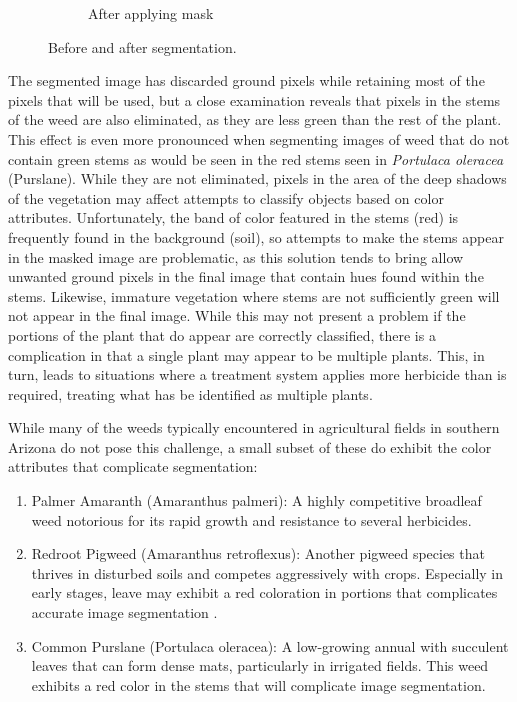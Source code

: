 \documentclass[letterpaper, notitlepage]{report}
\begin{document}
{\begin{figure}[H]
\begin{subfigure}[h]{.30\textwidth}
	  \caption{After applying mask}
	  \label{fig:original-masked}
	\end{subfigure}
	\caption[Before and after segmentation]{Before and after segmentation.}
	\label{fig:segmentation}
\end{figure}
The segmented image has discarded ground pixels while retaining most of the pixels that will be used, but a close examination reveals that pixels in the stems of the weed are also eliminated, as they are less green than the rest of the plant. This effect is even more pronounced when segmenting images of weed that do not contain green stems as would be seen in the red stems seen in \textit{Portulaca oleracea} (Purslane). While they are not eliminated, pixels in the area of the deep shadows of the vegetation may affect attempts to classify objects based on color attributes. Unfortunately, the band of color featured in the stems (red) is frequently found in the background (soil), so attempts to make the stems appear in the masked image are problematic, as this solution tends to bring allow unwanted ground pixels in the final image that contain hues found within the stems. Likewise, immature vegetation where stems are not sufficiently green will not appear in the final image.  While this may not present a problem if the portions of the plant that do appear are correctly classified, there is a complication in that a single plant may appear to be multiple plants. This, in turn, leads to situations where a treatment system applies more herbicide than is required, treating what has be identified as multiple plants.

While many of the weeds typically encountered in agricultural fields in southern Arizona do not pose this challenge,  a small subset of these do exhibit the color attributes that complicate segmentation:
\begin{enumerate}
	\item{Palmer Amaranth (Amaranthus palmeri): A highly competitive broadleaf weed notorious for its rapid growth and resistance to several herbicides.}

	\item{Redroot Pigweed (Amaranthus retroflexus): Another pigweed species that thrives in disturbed soils and competes aggressively with crops. Especially in early stages, leave may exhibit a red coloration in portions that complicates accurate image segmentation \parencite{Sosnoskie2018-ye}.}

	\item{Common Purslane (Portulaca oleracea): A low-growing annual with succulent leaves that can form dense mats, particularly in irrigated fields. This weed exhibits a red color in the stems that will complicate image segmentation.}


\end{enumerate}}
\end{document}
